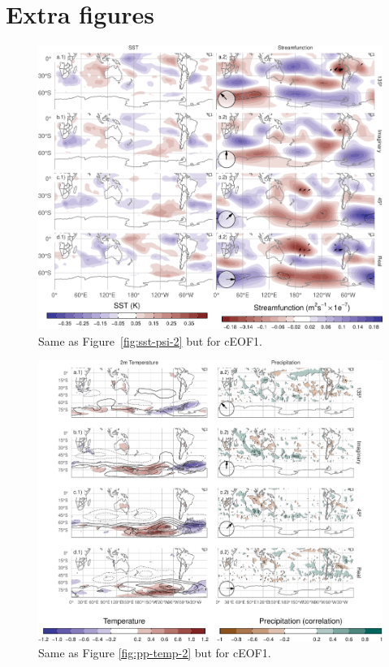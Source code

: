 \documentclass[smallextended]{svjour3}       %
\begin{document}
\appendix


\hypertarget{extra-figures}{%
\section{Extra figures}\label{extra-figures}}

\newpage



\begin{figure}
\includegraphics{../figures/sst-psi-1-1} \caption{Same as Figure~\ref{fig:sst-psi-2} but for cEOF1.}\label{fig:sst-psi-1}
\end{figure}



\begin{figure}
\centering
\includegraphics{../figures/pp-temp-1-1.pdf}
\caption{\label{fig:pp-temp-1}Same as Figure \ref{fig:pp-temp-2} but for cEOF1.}
\end{figure}
\end{document}
